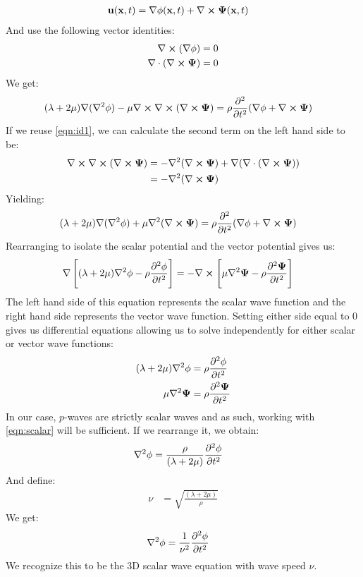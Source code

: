 \begin{align*}
    \vb{u}(\vb{x},t) &= \nabla \phi(\vb{x}, t)+\nabla\cross\vb{\Psi}(\vb{x},t)
\end{align*}
And use the following vector identities\cite[54]{stein2009introduction}:
\begin{align*}
    \nabla\cross(\nabla\phi) &= 0\\
    \nabla\cdot(\nabla\cross\vb{\Psi}) &= 0
\end{align*}
We get:
\begin{align*}
    (\lambda+2\mu)\nabla(\nabla^2\phi)-\mu\nabla\cross\nabla\cross(\nabla\cross\vb{\Psi}) &= \rho\frac{\partial ^2}{\partial t^2}(\nabla \phi+\nabla\cross\vb{\Psi})
\end{align*}
If we reuse \ref{eqn:id1}, we can calculate the second term on the left hand side to be:
\begin{align}
    \nabla\cross\nabla\cross(\nabla\cross\vb{\Psi}) &= -\nabla^2(\nabla\cross\vb{\Psi})+\nabla(\nabla\cdot(\nabla\cross\vb{\Psi}))\\
    &= -\nabla^2(\nabla\cross\vb{\Psi})
\end{align}
Yielding:
\begin{align*}
    (\lambda+2\mu)\nabla(\nabla^2\phi)+\mu\nabla^2(\nabla\cross\vb{\Psi}) &= \rho\frac{\partial ^2}{\partial t^2}(\nabla \phi+\nabla\cross\vb{\Psi})
\end{align*}
Rearranging to isolate the scalar potential and the vector potential gives us:
\begin{align}
    \nabla\left[(\lambda+2\mu)\nabla^2\phi-\rho\frac{\partial ^2\phi}{\partial t^2}\right] &= -\nabla\cross\left[\mu\nabla^2\vb{\Psi}-\rho\frac{\partial ^2\vb{\Psi}}{\partial t^2}\right]
\end{align}
The left hand side of this equation represents the scalar wave function and the right hand side represents the vector wave function. Setting either side equal to 0 gives us differential equations allowing us to solve independently for either scalar or vector wave functions:
\begin{align}
    (\lambda+2\mu)\nabla^2\phi&=\rho\frac{\partial ^2\phi}{\partial t^2}\label{eqn:scalar}\\
    \mu\nabla^2\vb{\Psi}&=\rho\frac{\partial ^2\vb{\Psi}}{\partial t^2}
\end{align}
In our case, $p$-waves are strictly scalar waves and as such, working with \ref{eqn:scalar} will be sufficient. If we rearrange it, we obtain:
\begin{align*}
    \nabla^2\phi&=\frac{\rho}{(\lambda+2\mu)}\frac{\partial ^2\phi}{\partial t^2}
\end{align*}
And define:
\begin{align*}
    \nu &= \sqrt{\frac{(\lambda+2\mu)}{\rho}}
\end{align*}
We get:
\begin{align}
    \nabla^2\phi&=\frac{1}{\nu^2}\frac{\partial ^2\phi}{\partial t^2}
\end{align}
We recognize this to be the 3D scalar wave equation with wave speed $\nu$.
